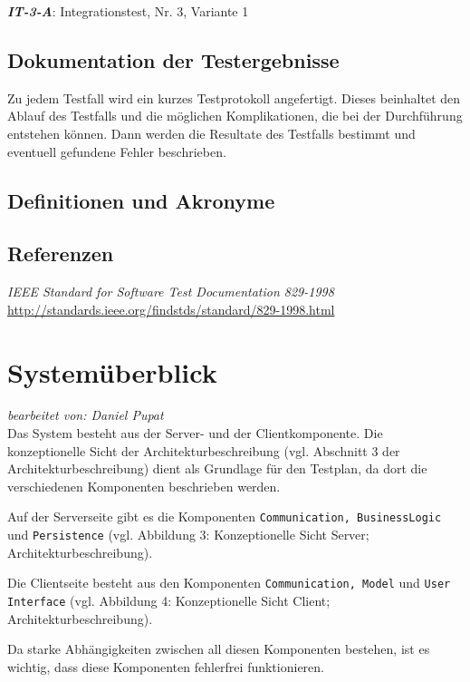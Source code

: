 \documentclass[fontsize=12pt,paper=a4,twoside]{scrartcl}
\begin{document}
\textbf{\emph{IT-3-A}}: Integrationstest, Nr. 3, Variante 1

\subsection{Dokumentation der Testergebnisse}

Zu jedem Testfall wird ein kurzes Testprotokoll angefertigt. Dieses beinhaltet den Ablauf des Testfalls und die möglichen Komplikationen, die bei der Durchführung entstehen können. Dann werden die Resultate des Testfalls bestimmt und eventuell gefundene Fehler beschrieben.

\subsection{Definitionen und Akronyme}
\label{c00b}


\subsection{Referenzen}
\emph{IEEE Standard for Software Test Documentation 829-1998}\\
\url{http://standards.ieee.org/findstds/standard/829-1998.html}




\section{Systemüberblick}\label{c02}
\textit{bearbeitet von: Daniel Pupat }\\

Das System besteht aus der Server- und der Clientkomponente. Die konzeptionelle Sicht der Architekturbeschreibung (vgl. Abschnitt 3 der Architekturbeschreibung) dient als Grundlage für den Testplan, da dort die verschiedenen Komponenten  beschrieben werden.

Auf der Serverseite gibt es die Komponenten \texttt{Communication, BusinessLogic} und \texttt{Persistence} (vgl. Abbildung 3: Konzeptionelle Sicht Server; Architekturbeschreibung).

Die Clientseite besteht aus den Komponenten \texttt{Communication, Model} und \texttt{User Interface} (vgl. Abbildung 4: Konzeptionelle Sicht Client; Architekturbeschreibung).

Da starke Abhängigkeiten zwischen all diesen Komponenten bestehen, ist es wichtig, dass diese Komponenten fehlerfrei funktionieren. 
\end{document}
